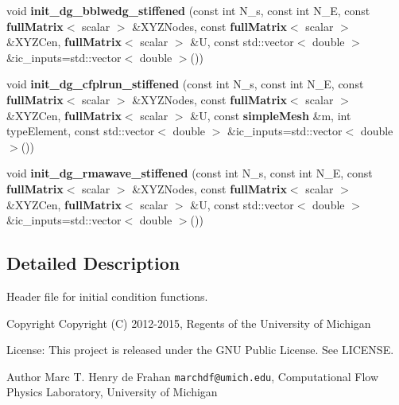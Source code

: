\begin{DoxyCompactItemize}
\item 
void {\bfseries init\-\_\-dg\-\_\-bblwedg\-\_\-stiffened} (const int N\-\_\-s, const int N\-\_\-\-E, const {\bf full\-Matrix}$<$ scalar $>$ \&X\-Y\-Z\-Nodes, const {\bf full\-Matrix}$<$ scalar $>$ \&X\-Y\-Z\-Cen, {\bf full\-Matrix}$<$ scalar $>$ \&U, const std\-::vector$<$ double $>$ \&ic\-\_\-inputs=std\-::vector$<$ double $>$())\label{init__cond_8h_a5d3f70b83b6dc1e2608e33c127f32df4}

\item 
void {\bfseries init\-\_\-dg\-\_\-cfplrun\-\_\-stiffened} (const int N\-\_\-s, const int N\-\_\-\-E, const {\bf full\-Matrix}$<$ scalar $>$ \&X\-Y\-Z\-Nodes, const {\bf full\-Matrix}$<$ scalar $>$ \&X\-Y\-Z\-Cen, {\bf full\-Matrix}$<$ scalar $>$ \&U, const {\bf simple\-Mesh} \&m, int type\-Element, const std\-::vector$<$ double $>$ \&ic\-\_\-inputs=std\-::vector$<$ double $>$())\label{init__cond_8h_a81cbde5c72b2ef4bc787b7f0a0a48d13}

\item 
void {\bfseries init\-\_\-dg\-\_\-rmawave\-\_\-stiffened} (const int N\-\_\-s, const int N\-\_\-\-E, const {\bf full\-Matrix}$<$ scalar $>$ \&X\-Y\-Z\-Nodes, const {\bf full\-Matrix}$<$ scalar $>$ \&X\-Y\-Z\-Cen, {\bf full\-Matrix}$<$ scalar $>$ \&U, const std\-::vector$<$ double $>$ \&ic\-\_\-inputs=std\-::vector$<$ double $>$())\label{init__cond_8h_a7a961281f92b467971588265ebce6948}

\end{DoxyCompactItemize}


\subsection{Detailed Description}
Header file for initial condition functions. \begin{DoxyCopyright}{Copyright}
Copyright (C) 2012-\/2015, Regents of the University of Michigan 
\end{DoxyCopyright}
\begin{DoxyParagraph}{License\-:}
This project is released under the G\-N\-U Public License. See L\-I\-C\-E\-N\-S\-E. 
\end{DoxyParagraph}
\begin{DoxyAuthor}{Author}
Marc T. Henry de Frahan {\tt marchdf@umich.\-edu}, Computational Flow Physics Laboratory, University of Michigan 
\end{DoxyAuthor}
